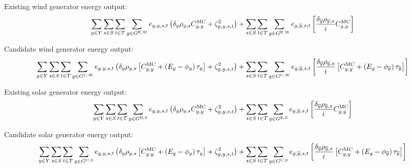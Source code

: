 \documentclass{article}
\newcommand{\sGeneratorsExistingWind}{G^{\mathrm{E,W}}}
\newcommand{\sGeneratorsExistingSolar}{G^{\mathrm{E,S}}}
\newcommand{\sGeneratorsCandidateWind}{G^{\mathrm{C,W}}}
\newcommand{\sGeneratorsCandidateSolar}{G^{\mathrm{C,S}}}
\newcommand{\sScenarios}{S}
\newcommand{\sIntervals}{T}
\newcommand{\iGenerator}{g}
\newcommand{\iYear}{y}
\newcommand{\iYearTerminal}{\overline{\iYear}}
\newcommand{\iScenario}{s}
\newcommand{\iInterval}{t}
\newcommand{\cScenarioDuration}[1][\iYear,\iScenario]{\rho_{#1}}
\newcommand{\cMarginalCost}[1][\iGenerator,\iYear]{C^{\mathrm{MC}}_{#1}}
\newcommand{\cEmissionsIntensity}[1][\iGenerator]{E_{#1}}
\newcommand{\cInterestRate}{i}
\newcommand{\cDiscountRate}[1][\iYear]{\delta_{#1}}
\newcommand{\vBaseline}[1][\iYear]{\phi_{#1}}
\newcommand{\vPermitPrice}[1][\iYear]{\tau_{#1}}
\newcommand{\vEnergy}[1][\iGenerator,\iYear,\iScenario,\iInterval]{e_{#1}}
\newcommand{\dGeneratorEnergyOutput}[1][\iGenerator,\iYear,\iScenario,\iInterval]{\zeta_{#1}^{2}}
\begin{document}
Existing wind generator energy output:
\begin{equation}
	\sumIntervals \sum\limits_{\iGenerator \in \sGeneratorsExistingWind} \vEnergy \left(\cDiscountRate\cScenarioDuration \cMarginalCost + \dGeneratorEnergyOutput \right) + \sum\limits_{\iScenario \in \sScenarios} \sum\limits_{\iInterval \in \sIntervals} \sum\limits_{\iGenerator \in \sGeneratorsExistingWind} \vEnergy[\iGenerator,\iYearTerminal,\iScenario,\iInterval] \left[ \frac{\cDiscountRate[\iYearTerminal] \cScenarioDuration[\iYearTerminal,\iScenario]}{\cInterestRate} \cMarginalCost \right]
\end{equation}

Candidate wind generator energy output:
\begin{equation}
	\sumIntervals \sum\limits_{\iGenerator \in \sGeneratorsCandidateWind} \vEnergy \left(\cDiscountRate\cScenarioDuration \left[\cMarginalCost + \left(\cEmissionsIntensity - \vBaseline\right)\vPermitPrice \right] + \dGeneratorEnergyOutput \right) + \sum\limits_{\iScenario \in \sScenarios} \sum\limits_{\iInterval \in \sIntervals} \sum\limits_{\iGenerator \in \sGeneratorsCandidateWind} \vEnergy[\iGenerator,\iYearTerminal,\iScenario,\iInterval] \left[ \frac{\cDiscountRate[\iYearTerminal] \cScenarioDuration[\iYearTerminal,\iScenario]}{\cInterestRate} \left[\cMarginalCost + \left(\cEmissionsIntensity - \vBaseline[\iYearTerminal] \right)\vPermitPrice[\iYearTerminal] \right] \right]
\end{equation}

Existing solar generator energy output:
\begin{equation}
	\sumIntervals \sum\limits_{\iGenerator \in \sGeneratorsExistingSolar} \vEnergy \left(\cDiscountRate\cScenarioDuration \cMarginalCost + \dGeneratorEnergyOutput \right) + \sum\limits_{\iScenario \in \sScenarios} \sum\limits_{\iInterval \in \sIntervals} \sum\limits_{\iGenerator \in \sGeneratorsExistingSolar} \vEnergy[\iGenerator,\iYearTerminal,\iScenario,\iInterval] \left[ \frac{\cDiscountRate[\iYearTerminal] \cScenarioDuration[\iYearTerminal,\iScenario]}{\cInterestRate} \cMarginalCost \right]
\end{equation}

Candidate solar generator energy output:
\begin{equation}
	\sumIntervals \sum\limits_{\iGenerator \in \sGeneratorsCandidateSolar} \vEnergy \left(\cDiscountRate\cScenarioDuration \left[\cMarginalCost + \left(\cEmissionsIntensity - \vBaseline\right)\vPermitPrice \right] + \dGeneratorEnergyOutput \right) + \sum\limits_{\iScenario \in \sScenarios} \sum\limits_{\iInterval \in \sIntervals} \sum\limits_{\iGenerator \in \sGeneratorsCandidateSolar} \vEnergy[\iGenerator,\iYearTerminal,\iScenario,\iInterval] \left[ \frac{\cDiscountRate[\iYearTerminal] \cScenarioDuration[\iYearTerminal,\iScenario]}{\cInterestRate} \left[\cMarginalCost + \left(\cEmissionsIntensity - \vBaseline[\iYearTerminal] \right)\vPermitPrice[\iYearTerminal] \right] \right]
\end{equation}
\end{document}
